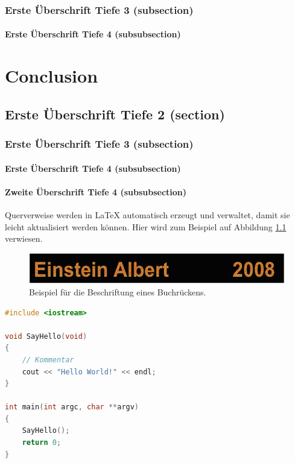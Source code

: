 \documentclass[BIF,Master,nenglish]{twbook}%
\begin{document}
\subsection{Erste Überschrift Tiefe 3 (subsection)}

\subsubsection{Erste Überschrift Tiefe 4 (subsubsection)}


\chapter{Conclusion}

\section{Erste Überschrift Tiefe 2 (section)}

\subsection{Erste Überschrift Tiefe 3 (subsection)}

\subsubsection{Erste Überschrift Tiefe 4 (subsubsection)}


\subsubsection{Zweite Überschrift Tiefe 4 (subsubsection)}

\noindent Querverweise werden in \LaTeX{} automatisch erzeugt und verwaltet, damit sie leicht aktualisiert werden können. Hier wird zum Beispiel auf Abbildung \ref{Abb1} verwiesen.

\begin{figure}[!htbp]
\centering
\includegraphics[width=0.5\linewidth]{PICs/buchruecken}
\caption{Beispiel für die Beschriftung eines Buchrückens.}\label{Abb1}
\end{figure}


\begin{lstlisting}[language=C++,name={1. Beispiel},label={sc:bsp:1}]
#include <iostream>

void SayHello(void)
{
    // Kommentar
    cout << "Hello World!" << endl;
}

int main(int argc, char **argv)
{
    SayHello();
    return 0;
}
\end{lstlisting}
\end{document}
